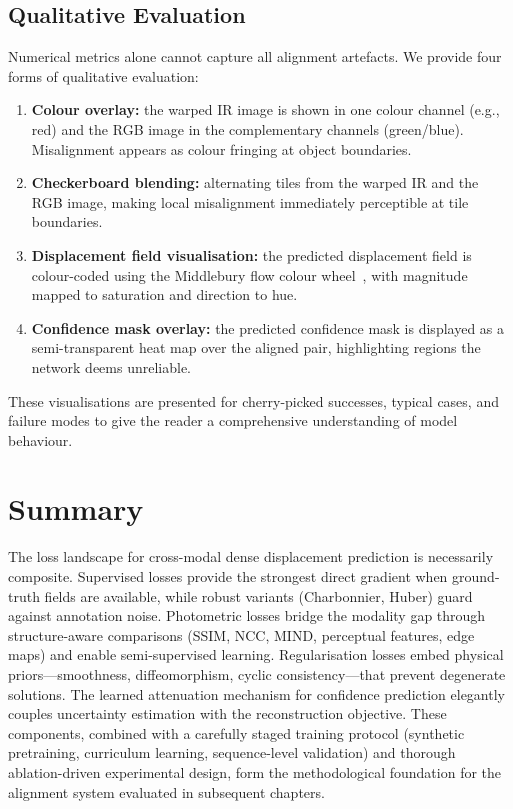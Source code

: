 \subsection{Qualitative Evaluation}
\label{ssec:qualitative}

Numerical metrics alone cannot capture all alignment artefacts.  We provide
four forms of qualitative evaluation:

\begin{enumerate}
  \item \textbf{Colour overlay:} the warped IR image is shown in one
        colour channel (e.g., red) and the RGB image in the complementary
        channels (green/blue).  Misalignment appears as colour fringing at
        object boundaries.
  \item \textbf{Checkerboard blending:} alternating tiles from the warped
        IR and the RGB image, making local misalignment immediately
        perceptible at tile boundaries.
  \item \textbf{Displacement field visualisation:} the predicted
        displacement field is colour-coded using the Middlebury flow colour
        wheel~\cite{baker2011middlebury}, with magnitude mapped to saturation
        and direction to hue.
  \item \textbf{Confidence mask overlay:} the predicted confidence mask is
        displayed as a semi-transparent heat map over the aligned pair,
        highlighting regions the network deems unreliable.
\end{enumerate}

These visualisations are presented for cherry-picked successes, typical cases,
and failure modes to give the reader a comprehensive understanding of model
behaviour.


\section{Summary}
\label{sec:loss_summary}

The loss landscape for cross-modal dense displacement prediction is
necessarily composite.  Supervised losses provide the strongest direct
gradient when ground-truth fields are available, while robust variants
(Charbonnier, Huber) guard against annotation noise.  Photometric losses
bridge the modality gap through structure-aware comparisons (SSIM, NCC,
MIND, perceptual features, edge maps) and enable semi-supervised learning.
Regularisation losses embed physical priors---smoothness, diffeomorphism,
cyclic consistency---that prevent degenerate solutions.  The learned
attenuation mechanism for confidence prediction elegantly couples uncertainty
estimation with the reconstruction objective.  These components, combined
with a carefully staged training protocol (synthetic pretraining, curriculum
learning, sequence-level validation) and thorough ablation-driven
experimental design, form the methodological foundation for the alignment
system evaluated in subsequent chapters.
